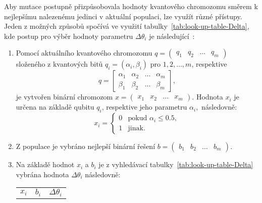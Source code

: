 Aby mutace postupně přizpůsobovala hodnoty kvantového chromozomu směrem k nejlepšímu nalezenému jedinci v aktuální populaci, lze využít různé přístupy. 
Jeden z možných způsobů spočívá ve využití tabulky~\ref{tab:look-up-table-Delta}, kde postup pro výběr hodnoty parametru $\Delta\theta_i$ je následující~\cite{NaturalComputing}:
\begin{enumerate}
    \item Pomocí aktuálního kvantového chromozomu $q = \begin{pmatrix} q_1 & q_2 & \dots & q_m \end{pmatrix}$ složeného z kvantových bitů $ q_i = \left( \alpha_i, \beta_i \right)$ pro $1,2,\dots,m$, respektive
        \begin{equation*}
            q =
            \begin{bmatrix}
                \alpha_1 & \alpha_2 & \dots & \alpha_m \\
                \beta_1  & \beta_2  & \dots & \beta_m
            \end{bmatrix},
        \end{equation*}
        je vytvořen binární chromozom $x = \begin{pmatrix} x_1 & x_2 & \dots & x_m \end{pmatrix}$.
        Hodnota $x_i$ je určena na základě qubitu $q_i$, respektive jeho parametru $\alpha_i$,~následovně:
        \begin{equation*}
            x_i =
            \begin{cases} 
                0 & \text{pokud } \alpha_i \leq 0.5, \\
                1 & \text{jinak}.
            \end{cases}
        \end{equation*}
    \item Z populace je vybráno nejlepší binární řešení $b = \begin{pmatrix} b_1 & b_2 & \dots & b_m \end{pmatrix}$.
    \item Na základě hodnot $x_i$ a $b_i$ je z vyhledávací tabulky~\ref{tab:look-up-table-Delta} vybrána hodnota $\Delta\theta_i$ následovně:
        \begin{table}[ht!]
            \centering
            \begin{tabular}{c c|c}
            \toprule
            \multicolumn{1}{c}{$x_i$} & \multicolumn{1}{c}{$b_i$} & \multicolumn{1}{|c}{$\Delta\theta_i$} \\

\end{tabular}
\end{table}
\end{enumerate}
